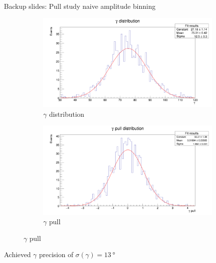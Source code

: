 \documentclass{beamer}
\begin{document}
\begin{frame}{Backup slides: Pull study naive amplitude binning}
  \begin{figure}
    \centering
    \vspace{-0.2cm}
    \begin{subfigure}{0.5\textwidth}
      \includegraphics[width = 1.0\textwidth]{GammaDistribution8BinsFixedWidth.png}
      \caption{$\gamma$ distribution}
    \end{subfigure}%
    \begin{subfigure}{0.5\textwidth}
      \includegraphics[width = 1.0\textwidth]{GammaPull8BinsFixedWidth.png}
      \caption{$\gamma$ pull}
    \end{subfigure}
  \end{figure}
  \begin{center}
    Achieved $\gamma$ precision of $\sigma(\gamma) = \SI{13}{\degree}$
  \end{center}
\end{frame}
\end{document}
